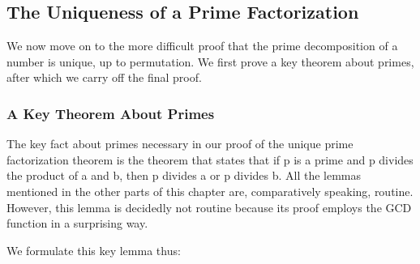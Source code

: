 \documentclass[10pt]{book}
\begin{document}
\subsection{The Uniqueness of a Prime Factorization}
We now move on to the more difficult proof that the prime decomposition
of a number is unique, up to permutation.  We first prove a key theorem
about primes, after which we  carry off the final proof.

\subsubsection{A Key Theorem About Primes}
The key fact about primes necessary in our proof of the unique
prime factorization theorem is the theorem  that states that
if p is a prime and p divides the product of a and b, then p
divides a or p divides b.  All the lemmas mentioned in
the other parts of this chapter are,  comparatively speaking,
routine.  However, this lemma is decidedly not routine because
its proof employs the GCD function in a surprising way.

We formulate this key lemma thus:
\end{document}
